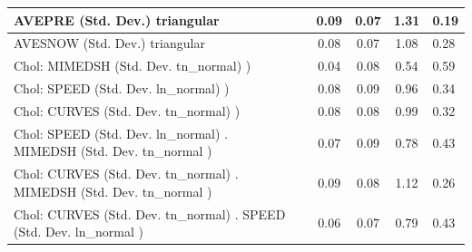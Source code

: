 \begin{table}
\begin{center}
\begin{tabular}{|l|l|c|c|c|l|}
			\hline
			AVEPRE (Std. Dev.) triangular &  & 0.09 & 0.07 & 1.31 & 0.19 \\
			\hline
			AVESNOW (Std. Dev.) triangular &  & 0.08 & 0.07 & 1.08 & 0.28 \\
			\hline
			 Chol: MIMEDSH (Std. Dev. tn_normal) ) &  & 0.04 & 0.08 & 0.54 & 0.59 \\
			\hline
			 Chol: SPEED (Std. Dev. ln_normal) ) &  & 0.08 & 0.09 & 0.96 & 0.34 \\
			\hline
			 Chol: CURVES (Std. Dev. tn_normal) ) &  & 0.08 & 0.08 & 0.99 & 0.32 \\
			\hline
			 Chol: SPEED (Std. Dev. ln_normal) . MIMEDSH (Std. Dev.   tn_normal ) &  & 0.07 & 0.09 & 0.78 & 0.43 \\
			\hline
			 Chol: CURVES (Std. Dev. tn_normal) . MIMEDSH (Std. Dev.   tn_normal ) &  & 0.09 & 0.08 & 1.12 & 0.26 \\
			\hline
			 Chol: CURVES (Std. Dev. tn_normal) . SPEED (Std. Dev.   ln_normal ) &  & 0.06 & 0.07 & 0.79 & 0.43 \\
			\hline
		\end{tabular}
	\end{center}
\end{table}